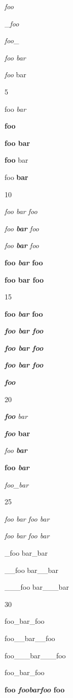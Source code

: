 
\def\mytitle{Emph and Strong UL}


\emph{foo}

\_\emph{foo}

\emph{foo}\_

\emph{foo bar}

\emph{foo} bar

5

foo \emph{bar}

\textbf{foo}

\textbf{foo bar}

\textbf{foo} bar

foo \textbf{bar}

10

\emph{foo \emph{bar} foo}

\emph{foo \textbf{bar} foo}

\emph{foo \textbf{\emph{bar}} foo}

\textbf{foo \emph{bar} foo}

\textbf{foo \textbf{bar} foo}

15

\textbf{foo \textbf{\emph{bar}} foo}

\textbf{\emph{foo \emph{bar} foo}}

\textbf{\emph{foo \textbf{bar} foo}}

\textbf{\emph{foo \textbf{\emph{bar}} foo}}

\textbf{\emph{foo}}

20

\emph{\textbf{foo} bar}

\textbf{\emph{foo} bar}

\emph{foo \textbf{bar}}

\textbf{foo \emph{bar}}

\emph{foo\_bar}

25

\emph{foo \emph{bar \emph{foo \emph{bar}}}}

\emph{\emph{\emph{\emph{foo} bar} foo} bar}

\_foo bar\_bar

\_\_foo bar\_\_bar

\_\_\_foo bar\_\_\_bar

30

foo\_bar\_foo

foo\_\_bar\_\_foo

foo\_\_\_bar\_\_\_foo

foo\_bar\_foo

\textbf{foo \emph{foobarfoo} foo}

